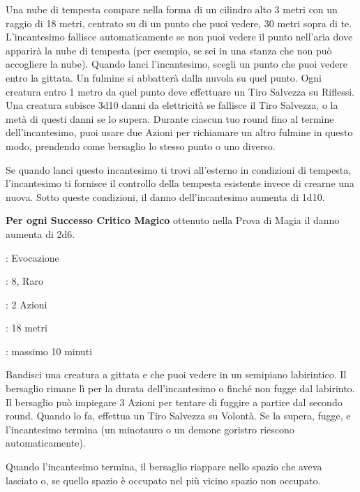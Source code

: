 \begin{multicols}{2}
Una nube di tempesta compare nella forma di un cilindro alto 3 metri con un raggio di 18 metri, centrato su di un punto che puoi vedere, 30 metri sopra di te. L'incantesimo fallisce automaticamente se non puoi vedere il punto nell'aria dove apparirà la nube di tempesta (per esempio, se sei in una stanza che non può accogliere la nube). Quando lanci l'incantesimo, scegli un punto che puoi vedere entro la gittata. Un fulmine si abbatterà dalla nuvola su quel punto. Ogni creatura entro 1 metro da quel punto deve effettuare un Tiro Salvezza su Riflessi. Una creatura subisce 3d10 danni da elettricità se fallisce il Tiro Salvezza, o la metà di questi danni se lo supera. Durante ciascun tuo round fino al termine dell'incantesimo, puoi usare due Azioni per richiamare un altro fulmine in questo modo, prendendo come bersaglio lo stesso punto o uno diverso.

Se quando lanci questo incantesimo ti trovi all'esterno in condizioni di tempesta, l'incantesimo ti fornisce il controllo della tempesta esistente invece di crearne una nuova. Sotto queste condizioni, il danno dell'incantesimo aumenta di 1d10.

\textbf{Per ogni Successo Critico Magico} ottenuto nella Prova di Magia il danno aumenta di 2d6.

\noindent\colorbox{OBSSgold!10}{
\begin{minipage}{0.95\linewidth}
\begin{description}[noitemsep, topsep=0pt, parsep=0pt, partopsep=0pt, leftmargin=0cm, labelwidth=1.3cm]
	\item[\textbf{Lista}]: Evocazione
	\item[\textbf{Livello}]: 8, Raro
	\item[\textbf{Lancio}]: 2 Azioni
	\item[\textbf{Gittata}]: 18 metri
	\item[\textbf{Durata}]: massimo 10 minuti
\end{description}
\end{minipage}}\smallskip

Bandisci una creatura a gittata e che puoi vedere in un semipiano labirintico. Il bersaglio rimane lì per la durata dell'incantesimo o finché non fugge dal labirinto. Il bersaglio può impiegare 3 Azioni per tentare di fuggire a partire dal secondo round. Quando lo fa, effettua un Tiro Salvezza su Volontà. Se la supera, fugge, e l'incantesimo termina (un minotauro o un demone goristro riescono automaticamente).

Quando l'incantesimo termina, il bersaglio riappare nello spazio che aveva lasciato o, se quello spazio è occupato nel più vicino spazio non occupato.


\end{multicols}
